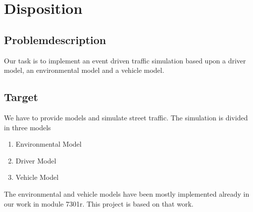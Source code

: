 \documentclass[a4paper,10pt,titlepage]{article}
\begin{document}


\tableofcontents


\newpage

\section{Disposition}

\subsection{Problemdescription}
Our task is to implement an event driven traffic simulation based upon a driver model, an environmental model and a vehicle model.

\subsection{Target}
We have to provide models and simulate street traffic. The simulation is divided in three models
\begin{enumerate}
 \item Environmental Model%
 \item Driver Model%
 \item Vehicle Model%
\end{enumerate}
The environmental and vehicle models have been mostly implemented already in our work in module 7301r. This project is based on that work.
\end{document}

